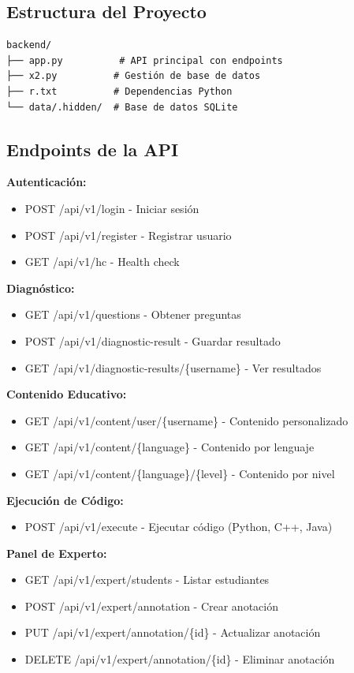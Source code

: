 \documentclass[12pt,a4paper]{article}
\begin{document}
\subsection{Estructura del Proyecto}
\begin{verbatim}
backend/
├── app.py          # API principal con endpoints
├── x2.py          # Gestión de base de datos
├── r.txt          # Dependencias Python
└── data/.hidden/  # Base de datos SQLite
\end{verbatim}

\subsection{Endpoints de la API}

\textbf{Autenticación:}
\begin{itemize}
    \item POST /api/v1/login - Iniciar sesión
    \item POST /api/v1/register - Registrar usuario
    \item GET /api/v1/hc - Health check
\end{itemize}

\textbf{Diagnóstico:}
\begin{itemize}
    \item GET /api/v1/questions - Obtener preguntas
    \item POST /api/v1/diagnostic-result - Guardar resultado
    \item GET /api/v1/diagnostic-results/\{username\} - Ver resultados
\end{itemize}

\textbf{Contenido Educativo:}
\begin{itemize}
    \item GET /api/v1/content/user/\{username\} - Contenido personalizado
    \item GET /api/v1/content/\{language\} - Contenido por lenguaje
    \item GET /api/v1/content/\{language\}/\{level\} - Contenido por nivel
\end{itemize}

\textbf{Ejecución de Código:}
\begin{itemize}
    \item POST /api/v1/execute - Ejecutar código (Python, C++, Java)
\end{itemize}

\textbf{Panel de Experto:}
\begin{itemize}
    \item GET /api/v1/expert/students - Listar estudiantes
    \item POST /api/v1/expert/annotation - Crear anotación
    \item PUT /api/v1/expert/annotation/\{id\} - Actualizar anotación
    \item DELETE /api/v1/expert/annotation/\{id\} - Eliminar anotación
\end{itemize}
\end{document}
